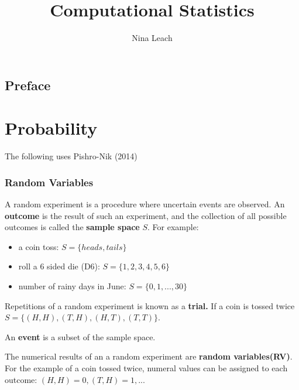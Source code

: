 \documentclass[
  letterpaper,
  DIV=11,
  numbers=noendperiod]{scrreprt}
\title{Computational Statistics}
\author{Nina Leach}
\date{}
\renewcommand*\contentsname{Table of contents}
\newcommand\contentsname{Table of contents}
\begin{document}
\maketitle

\renewcommand*\contentsname{Table of contents}
{
\hypersetup{linkcolor=}
\setcounter{tocdepth}{2}
\tableofcontents
}

\chapter*{Preface}\label{preface}


\part{Probability}

The following uses Pishro-Nik (2014)

\section*{Random Variables}\label{random-variables}


A random experiment is a procedure where uncertain events are observed.
An \textbf{outcome} is the result of such an experiment, and the
collection of all possible outcomes is called the \textbf{sample space}
\(S\). For example:

\begin{itemize}
\item
  a coin toss: \(S = \{heads,tails\}\)
\item
  roll a 6 sided die (D6): \(S = \{1, 2, 3, 4, 5, 6\}\)
\item
  number of rainy days in June: \(S = \{0, 1, ..., 30\}\)
\end{itemize}

Repetitions of a random experiment is known as a \textbf{trial.} If a
coin is tossed twice \(S = \{(H, H), (T, H), (H, T), (T, T)\}\).

An \textbf{event} is a subset of the sample space.

The numerical results of an a random experiment are \textbf{random
variables(RV)}. For the example of a coin tossed twice, numeral values
can be assigned to each outcome: \((H, H) = 0, (T, H) = 1, ...\)
\end{document}
